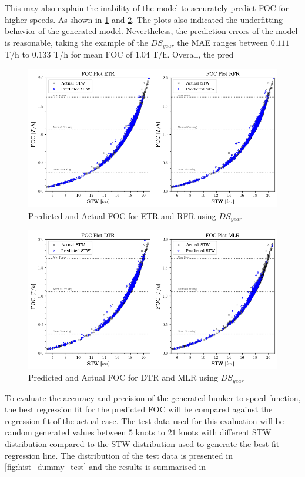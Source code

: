 This may also explain the inability of the model to accurately predict FOC for higher speeds. As shown in \cref{fig:foc_etr_rfr_yr} and \cref{fig:foc_dtr_mlr_yr}. The plots also indicated the underfitting behavior of the generated model. Nevertheless, the prediction errors of the model is reasonable, taking the example of the $DS_{year}$ the MAE ranges between $0.111$ T/h to $0.133$ T/h for mean FOC of $1.04$ T/h. Overall, the pred\\

\begin{figure}
    \centering
    \includegraphics[width=.9\linewidth]{02_figures/FOC_act_pred_etr_rfr.png}
    \caption{Predicted and Actual FOC for ETR and RFR using $DS_{year}$}
    \label{fig:foc_etr_rfr_yr}
\end{figure}

\begin{figure}
    \centering
    \includegraphics[width=.9\linewidth]{02_figures/FOC_act_pred_dtr_mlr.png}
    \caption{Predicted and Actual FOC for DTR and MLR using $DS_{year}$}
    \label{fig:foc_dtr_mlr_yr}
\end{figure}

To evaluate the accuracy and precision of the generated bunker-to-speed function, the best regression fit for the predicted FOC will be compared against the regression fit of the actual case. The test data used for this evaluation will be random generated values between $5$ knots to $21$ knots with different STW distribution compared to the STW distribution used to generate the best fit regression line. The distribution of the test data is presented in \cref{fig:hist_dummy_test} and the results is summarised in 

